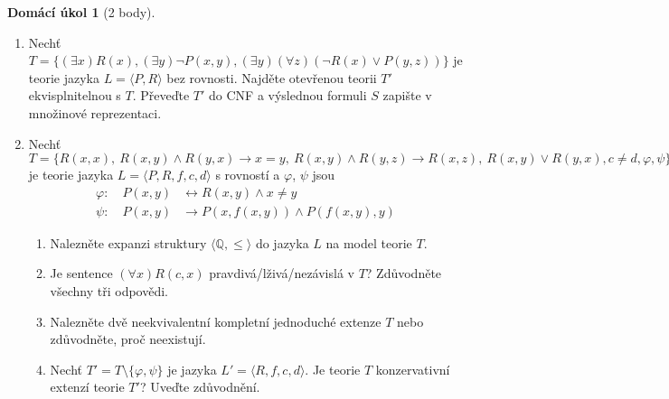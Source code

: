 \documentclass[a4paper]{article}
\theoremstyle{definition}
\newtheorem*{ukol}{Domácí úkol}
\begin{document}
\medskip\begin{ukol}[2 body] {\,}
\begin{enumerate}[label=\arabic*.]
\item Nechť $T=\{(\exists x)R(x), (\exists y)\neg P(x,y), (\exists y)(\forall z)(\neg R(x)\vee P(y,z))\}$ je teorie jazyka $L=\langle P,R\rangle$ bez rovnosti. Najděte otevřenou teorii $T'$ ekvisplnitelnou s $T$. Převeďte $T'$ do CNF a výslednou formuli $S$ zapište v množinové reprezentaci.
\item Nechť $T=\{R(x,x),\ R(x,y) \wedge R(y,x) \to x=y,\ R(x,y) \wedge R(y,z) \to R(x,z),\ R(x,y) \vee R(y,x), c\ne d, \varphi,\psi\}$ je teorie jazyka $L=\langle P,R,f,c,d\rangle$ s rovností
a $\varphi$, $\psi$ jsou
\begin{align*}
    \varphi:\quad P(x,y) &\leftrightarrow R(x,y) \wedge x\ne y\\
    \psi:\quad P(x,y) &\to P(x,f(x,y)) \wedge P(f(x,y),y)
\end{align*}
\begin{enumerate}
    \item Nalezněte expanzi struktury $\langle \mathbb{Q},\le \rangle$ do jazyka $L$ na model teorie $T$.
    \item Je sentence $(\forall x)R(c,x)$ pravdivá/lživá/nezávislá v $T$? Zdůvodněte všechny tři odpovědi.
    \item Nalezněte dvě neekvivalentní kompletní jednoduché extenze $T$ nebo zdůvodněte, proč neexistují.
    \item Nechť $T'=T\setminus\{\varphi,\psi\}$ je jazyka $L'=\langle R,f,c,d\rangle$. Je teorie $T$ konzervativní extenzí teorie $T'$? Uveďte zdůvodnění.
\end{enumerate}
\end{enumerate}

\end{ukol}
\end{document}
